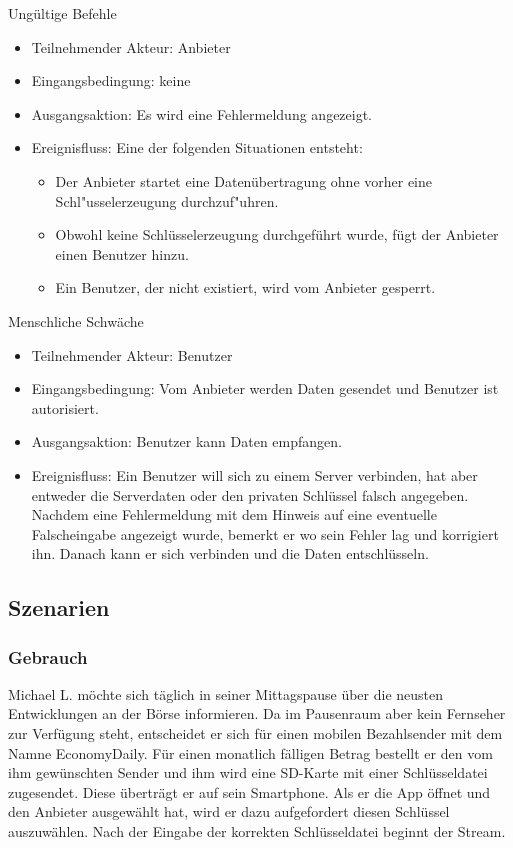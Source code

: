 \documentclass[a4paper,10pt]{scrartcl}
\begin{document}
\begin{usecase}
 {Ungültige Befehle
   \begin{itemize}
   \item Teilnehmender Akteur: Anbieter
   \item Eingangsbedingung: keine
   \item Ausgangsaktion: Es wird eine Fehlermeldung angezeigt.
   \item Ereignisfluss:
          Eine der folgenden Situationen entsteht:
          \begin{itemize}
           \item Der Anbieter startet eine Datenübertragung ohne vorher eine Schl"usselerzeugung
                 durchzuf"uhren.
           \item Obwohl keine Schlüsselerzeugung durchgeführt wurde, fügt der Anbieter einen Benutzer hinzu.
           \item Ein Benutzer, der nicht existiert, wird vom Anbieter gesperrt.
           \end{itemize}
   \end{itemize}
}
 {Menschliche Schwäche
   \begin{itemize}
   \item Teilnehmender Akteur: Benutzer
   \item Eingangsbedingung: Vom Anbieter werden Daten gesendet und Benutzer ist autorisiert.
   \item Ausgangsaktion: Benutzer kann Daten empfangen.
   \item Ereignisfluss: Ein Benutzer will sich zu einem Server verbinden, hat aber entweder
             die Serverdaten oder den privaten Schlüssel falsch angegeben. Nachdem eine
             Fehlermeldung mit dem Hinweis auf eine eventuelle Falscheingabe angezeigt wurde,
             bemerkt er wo sein Fehler lag und korrigiert ihn. Danach kann er sich verbinden
             und die Daten entschlüsseln.
   \end{itemize}
}
\end{usecase}

\subsection{Szenarien}

\subsubsection{Gebrauch}
Michael L. möchte sich täglich in seiner Mittagspause über die neusten Entwicklungen an der Börse informieren. 
Da im Pausenraum aber kein Fernseher zur Verfügung steht, entscheidet er sich für einen mobilen Bezahlsender mit dem Namne EconomyDaily. 
Für einen monatlich fälligen Betrag bestellt er den vom ihm gewünschten Sender und ihm wird eine SD-Karte mit einer Schlüsseldatei zugesendet. 
Diese überträgt er auf sein Smartphone. Als er die App öffnet und den Anbieter ausgewählt hat, wird er dazu aufgefordert diesen Schlüssel auszuwählen. 
Nach der Eingabe der korrekten Schlüsseldatei beginnt der Stream. 
\end{document}
